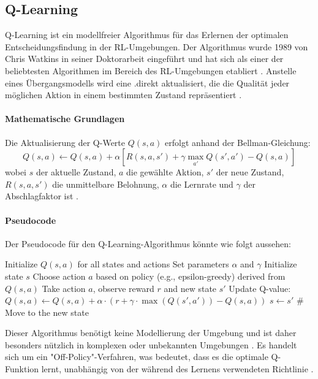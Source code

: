 \subsection{Q-Learning}
%
Q-Learning ist ein modellfreier Algorithmus für das Erlernen der optimalen Entscheidungsfindung in der RL-Umgebungen. Der Algorithmus wurde 1989 von Chris Watkins in seiner Doktorarbeit eingeführt und hat sich als einer der beliebtesten Algorithmen im Bereich des RL-Umgebungen etabliert \cite{morales2020grokking}. Anstelle eines Übergangsmodells wird eine .direkt aktualisiert, die die Qualität jeder möglichen Aktion in einem bestimmten Zustand repräsentiert \cite{russell2021ai}.
%
\paragraph{Mathematische Grundlagen}
%
Die Aktualisierung der Q-Werte \( Q(s, a) \) erfolgt anhand der Bellman-Gleichung:
\[
		Q(s, a) \leftarrow Q(s, a) + \alpha \left[ R(s, a, s') + \gamma \max_{a'} Q(s', a') - Q(s, a) \right]
		\label{eq: update q learning}
\]
wobei \( s \) der aktuelle Zustand, \( a \) die gewählte Aktion, \( s' \) der neue Zustand, \( R(s, a, s') \) die unmittelbare Belohnung, \( \alpha \) die Lernrate und \( \gamma \) der Abschlagfaktor ist \cite{russell2021ai}.
%
\paragraph{Pseudocode}
Der Pseudocode für den Q-Learning-Algorithmus könnte wie folgt aussehen:\\
%
\begin{algorithmic}
		\STATE Initialize $Q(s, a)$ for all states and actions
		\STATE Set parameters $\alpha$ and $\gamma$
		\STATE Initialize state $s$
		\STATE Choose action $a$ based on policy (e.g., epsilon-greedy) derived from $Q(s, a)$
		\STATE Take action $a$, observe reward $r$ and new state $s'$
		\STATE Update Q-value:
		\STATE $Q(s, a) \gets Q(s, a) + \alpha \cdot (r + \gamma \cdot \max(Q(s', a')) - Q(s, a))$
		\STATE $s \gets s'$  \# Move to the new state
		\ENDWHILE
		\ENDFOR
\end{algorithmic}
%
Dieser Algorithmus benötigt keine Modellierung der Umgebung und ist daher besonders nützlich in komplexen oder unbekannten Umgebungen \cite{morales2020grokking}. Es handelt sich um ein "Off-Policy"-Verfahren, was bedeutet, dass es die optimale Q-Funktion lernt, unabhängig von der während des Lernens verwendeten Richtlinie \cite{morales2020grokking}.

